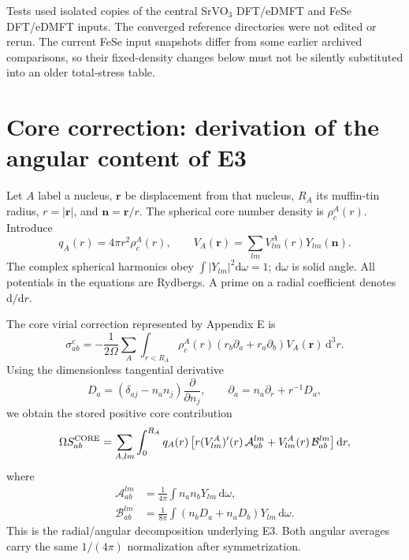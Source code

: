 \documentclass[11pt]{article}
\newcommand{\dd}{\mathrm d}
\begin{document}
Tests used isolated copies of the central SrVO$_3$ DFT/eDMFT and FeSe DFT/eDMFT inputs. The converged reference directories were not edited or rerun. The current FeSe input snapshots differ from some earlier archived comparisons, so their fixed-density changes below must not be silently substituted into an older total-stress table.

\section{Core correction: derivation of the angular content of E3}
Let $A$ label a nucleus, $\bm r$ be displacement from that nucleus, $R_A$ its muffin-tin radius, $r=|\bm r|$, and $\bm n=\bm r/r$. The spherical core number density is $\rho_c^A(r)$. Introduce
\begin{equation}
 q_A(r)=4\pi r^2\rho_c^A(r),\qquad
 V_A(\bm r)=\sum_{lm}V^A_{lm}(r)Y_{lm}(\bm n).
\end{equation}
The complex spherical harmonics obey $\int |Y_{lm}|^2\dd\omega=1$; $\dd\omega$ is solid angle. All potentials in the equations are Rydbergs. A prime on a radial coefficient denotes $\dd/\dd r$.

The core virial correction represented by Appendix E is
\begin{equation}\label{eq:core}
 \sigma^{c}_{ab}=-\frac1{2\Omega}\sum_A\int_{r<R_A}\rho_c^A(r)
       (r_b\partial_a+r_a\partial_b)V_A(\bm r)\,\dd^3r.
\end{equation}
Using the dimensionless tangential derivative
\begin{equation}
 D_a=(\delta_{aj}-n_an_j)\frac{\partial}{\partial n_j},\qquad
 \partial_a=n_a\partial_r+r^{-1}D_a,
\end{equation}
we obtain the stored positive core contribution
\begin{equation}\label{eq:radialcore}
 \Omega S^{\rm CORE}_{ab}=
 \sum_{A,lm}\int_0^{R_A}q_A(r)
 \left[r(V^A_{lm})'(r)\,\mathcal A^{lm}_{ab}
       +V^A_{lm}(r)\,\mathcal B^{lm}_{ab}\right]\dd r,
\end{equation}
where
\begin{align}
 \mathcal A^{lm}_{ab}&=\frac1{4\pi}\int n_an_bY_{lm}\,\dd\omega,\\
 \mathcal B^{lm}_{ab}&=\frac1{8\pi}\int(n_bD_a+n_aD_b)Y_{lm}\,\dd\omega.
\end{align}
This is the radial/angular decomposition underlying E3. Both angular averages carry the same $1/(4\pi)$ normalization after symmetrization.
\end{document}
